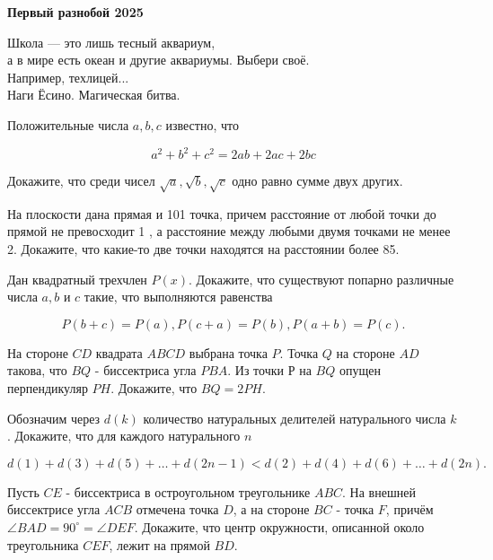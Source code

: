 \centerline{\bf \Huge Первый разнобой 2025}

\begin{flushright}
        \scriptsize{Школа — это лишь тесный аквариум,\\ а в мире есть океан и другие аквариумы. Выбери своё. \\Например, техлицей...\\Наги Ёсино. Магическая битва.}
\end{flushright}

Положительные числа $a, b, c$ известно, что

$$
a^2+b^2+c^2=2 a b+2 a c+2 b c
$$


Докажите, что среди чисел $\sqrt{a}, \sqrt{b}, \sqrt{c}$ одно равно сумме двух других.


На плоскости дана прямая и 101 точка, причем расстояние от любой точки до прямой не превосходит 1 , а расстояние между любыми двумя точками не менее 2. Докажите, что какие-то две точки находятся на расстоянии более 85.

Дан квадратный трехчлен $P(x)$. Докажите, что существуют попарно различные числа $a, b$ и $c$ такие, что выполняются равенства

$$
P(b+c)=P(a), P(c+a)=P(b), P(a+b)=P(c) .
$$

На стороне $C D$ квадрата $A B C D$ выбрана точка $P$. Точка $Q$ на стороне $A D$ такова, что $B Q$ - биссектриса угла $P B A$. Из точки Р на $B Q$ опущен перпендикуляр $P H$. Докажите, что $B Q=2 P H$.

Обозначим через $d(k)$ количество натуральных делителей натурального числа $k$. Докажите, что для каждого натурального $n$

$$
d(1)+d(3)+d(5)+\ldots+d(2 n-1)<d(2)+d(4)+d(6)+\ldots+d(2 n) .
$$

Пусть $C E$ - биссектриса в остроугольном треугольнике $A B C$. На внешней биссектрисе угла $A C B$ отмечена точка $D$, а на стороне $B C$ - точка $F$, причём $\angle B A D=90^{\circ}=\angle D E F$. Докажите, что центр окружности, описанной около треугольника $CEF$,
лежит на прямой $BD$. 

